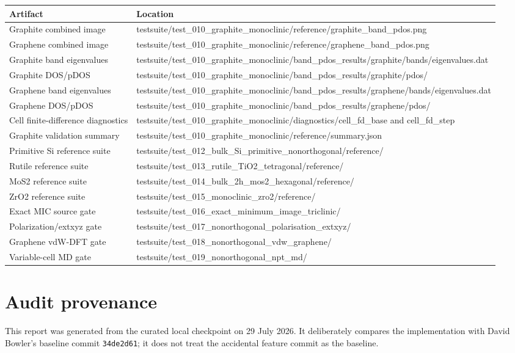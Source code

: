 \documentclass[10pt,a4paper]{report}
\begin{document}
\small\begin{longtable}{p{}|p{}}
\toprule Artifact & Location\\ \midrule\endhead
Graphite combined image & testsuite/test\_010\_graphite\_monoclinic/reference/graphite\_band\_pdos.png\\
Graphene combined image & testsuite/test\_010\_graphite\_monoclinic/reference/graphene\_band\_pdos.png\\
Graphite band eigenvalues & testsuite/test\_010\_graphite\_monoclinic/band\_pdos\_results/graphite/bands/eigenvalues.dat\\
Graphite DOS/pDOS & testsuite/test\_010\_graphite\_monoclinic/band\_pdos\_results/graphite/pdos/\\
Graphene band eigenvalues & testsuite/test\_010\_graphite\_monoclinic/band\_pdos\_results/graphene/bands/eigenvalues.dat\\
Graphene DOS/pDOS & testsuite/test\_010\_graphite\_monoclinic/band\_pdos\_results/graphene/pdos/\\
Cell finite-difference diagnostics & testsuite/test\_010\_graphite\_monoclinic/diagnostics/cell\_fd\_base and cell\_fd\_step\\
Graphite validation summary & testsuite/test\_010\_graphite\_monoclinic/reference/summary.json\\
Primitive Si reference suite & testsuite/test\_012\_bulk\_Si\_primitive\_nonorthogonal/reference/\\
Rutile reference suite & testsuite/test\_013\_rutile\_TiO2\_tetragonal/reference/\\
MoS2 reference suite & testsuite/test\_014\_bulk\_2h\_mos2\_hexagonal/reference/\\
ZrO2 reference suite & testsuite/test\_015\_monoclinic\_zro2/reference/\\
Exact MIC source gate & testsuite/test\_016\_exact\_minimum\_image\_triclinic/\\
Polarization/extxyz gate & testsuite/test\_017\_nonorthogonal\_polarisation\_extxyz/\\
Graphene vdW-DFT gate & testsuite/test\_018\_nonorthogonal\_vdw\_graphene/\\
Variable-cell MD gate & testsuite/test\_019\_nonorthogonal\_npt\_md/\\
\bottomrule\end{longtable}\normalsize
\appendix
\chapter{Audit provenance}
This report was generated from the curated local checkpoint on 29 July 2026. It deliberately compares the implementation with David Bowler's baseline commit \texttt{34de2d61}; it does not treat the accidental feature commit as the baseline.
\end{document}
